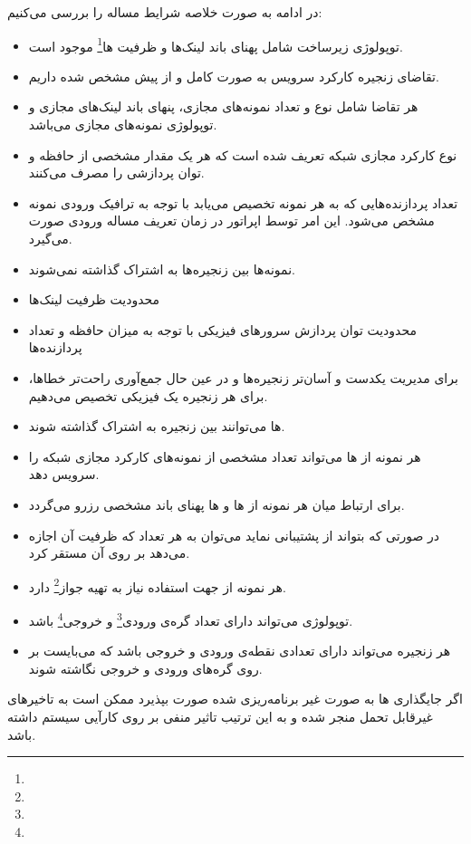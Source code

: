 در ادامه به صورت خلاصه شرایط مساله را بررسی می‌کنیم:

\begin{itemize}
    \item توپولوژی زیرساخت شامل پهنای باند لینک‌ها و ظرفیت ها\footnote{} موجود است.
    \item {} تقاضای زنجیره‌ کارکرد سرویس به صورت کامل و از پیش مشخص شده داریم.
    \item هر تقاضا شامل نوع و تعداد نمونه‌های مجازی، پنهای باند لینک‌های مجازی و توپولوژی نمونه‌های مجازی می‌باشد.
    \item {} نوع کارکرد مجازی شبکه تعریف شده است که هر یک مقدار مشخصی از حافظه و توان پردازشی را مصرف می‌کنند.
    \item تعداد پردازنده‌هایی که به هر نمونه تخصیص می‌یابد با توجه به ترافیک ورودی نمونه مشخص می‌شود. این امر توسط اپراتور در زمان تعریف مساله ورودی صورت می‌گیرد.
    \item نمونه‌ها بین زنجیره‌ها به اشتراک گذاشته نمی‌شوند.
    \item محدودیت ظرفیت لینک‌ها
    \item محدودیت توان پردازش سرورهای فیزیکی با توجه به میزان حافظه و تعداد پردازنده‌ها
    \item برای مدیریت یکدست و آسان‌تر زنجیره‌ها و در عین حال جمع‌آوری راحت‌تر خطاها، برای هر زنجیره یک  فیزیکی تخصیص می‌دهیم.
    \item {}ها می‌توانند بین زنجیره به اشتراک گذاشته شوند.
    \item هر نمونه از ها می‌تواند تعداد مشخصی از نمونه‌های کارکرد مجازی شبکه را سرویس دهد. 
    \item برای ارتباط میان هر نمونه از ها و ها پهنای باند مشخصی رزرو می‌گردد.
    \item در صورتی که  بتواند از  پشتیبانی نماید می‌توان به هر تعداد که ظرفیت آن اجازه می‌دهد بر روی آن  مستقر کرد.
    \item هر نمونه از  جهت استفاده نیاز به تهیه جواز\footnote{} دارد.
    \item توپولوژی می‌تواند دارای تعداد گره‌ی ورودی\footnote{} و خروجی\footnote{} باشد.
    \item هر زنجیره می‌تواند دارای تعدادی نقطه‌ی ورودی و خروجی باشد که می‌بایست بر روی گره‌های ورودی و خروجی نگاشته شوند.
\end{itemize}

اگر جایگذاری ها به صورت غیر برنامه‌ریزی شده صورت بپذیرد
ممکن است به تاخیرهای غیرقابل تحمل منجر شده و به این ترتیب تاثیر منفی بر روی کارآیی سیستم
داشته باشد.


